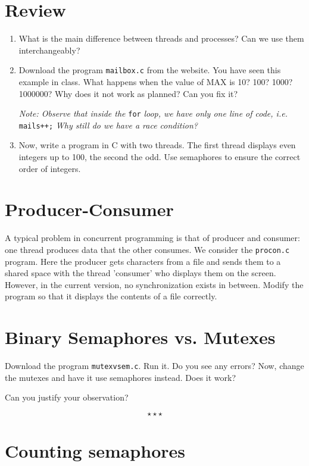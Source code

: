 \documentclass[11pt]{article}
\newcommand{\numtd}{03}
\newcommand{\titretd}{Threads and semaphores}
\begin{document}
	
	\entete{\numtd}{\titretd}

\section{Review}
\begin{enumerate}
	\item What is the main difference between threads and processes? Can we use them interchangeably?
	\item Download the program \texttt{mailbox.c} from the website. You have seen this example in class. What happens when the value of MAX is 10? 100? 1000? 1000000? Why does it not work as planned? Can you fix it?
	
	\emph{Note: Observe that inside the} \texttt{for} \emph{loop, we have only one line of code, i.e.} \texttt{mails++;} \emph{Why still do we have a race condition?}
	\item Now, write a program in C with two threads. The first thread displays even integers up to 100, the second the odd. Use semaphores to ensure the correct order of integers.
	
\end{enumerate} 

\section{Producer-Consumer}

A typical problem in concurrent programming is that of producer and consumer: one thread produces data that the other consumes. We consider the \texttt{procon.c} program. Here the producer gets characters from a file and sends them to a shared space with the thread 'consumer' who displays them on the screen. However, in the current version, no synchronization exists in between. Modify the program so that it displays the contents of a file correctly.

\section{Binary Semaphores vs. Mutexes}

Download the program \texttt{mutexvsem.c}. Run it. Do you see any errors? Now, change the mutexes and have it use semaphores instead. Does it work? 

Can you justify your observation?

$$\star \star\star$$

\section{Counting semaphores}
\end{document}
